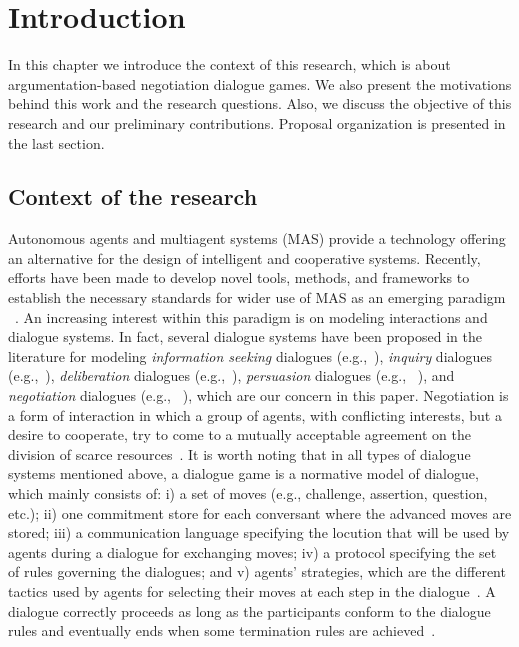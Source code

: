 \setcounter{chapter}{0}
\chapter{Introduction}\label{sec:intro}
In this chapter we introduce the context of this research, which is about argumentation-based negotiation dialogue games. We also present the motivations behind this work and the research questions. Also, we discuss the objective of this research and our preliminary contributions. Proposal organization is presented in the last section.

\section{Context of the research}\label{sec:context}

Autonomous agents and multiagent systems (MAS) provide a technology offering an alternative for the design of intelligent and cooperative
systems. Recently, efforts have been made to develop novel tools, methods, and frameworks to establish the necessary standards for wider
use of MAS as an emerging paradigm ~\cite{Mehdi03}. An increasing interest within this paradigm is on modeling interactions and dialogue systems.
In fact, several dialogue systems have been proposed in the literature for modeling \emph{information seeking} dialogues (e.g.,~\cite{MWParsons03}),
\emph{inquiry} dialogues (e.g.,~\cite{BlackH07,Black09}), \emph{deliberation} dialogues (e.g.,~\cite{Tolchinsky2012}), \emph{persuasion}
dialogues (e.g., ~\cite{Amgoud00}), and \emph{negotiation} dialogues (e.g., ~\cite{KSycara90}), which are our concern in this paper.
Negotiation is a form of interaction in which a group of agents, with conflicting interests, but a desire to cooperate, try to come to a mutually
acceptable agreement on the division of scarce resources~\cite{Rahwan03,Bentahar07}. It is worth noting that in all types of dialogue systems
mentioned above, a dialogue game is a normative model of dialogue, which mainly consists of: i) a set of moves (e.g., challenge, assertion, question, etc.);
ii) one commitment store for each conversant where the advanced moves are stored; iii) a communication language specifying the locution that will be
used by agents during a dialogue for exchanging moves; iv) a protocol specifying the set of rules governing the dialogues; and v) agents' strategies,
which are the different tactics used by agents for selecting their moves at each step in the dialogue~\cite{AmgoudS08}. A dialogue correctly proceeds
as long as the participants conform to the dialogue rules and eventually ends when some termination rules are achieved~\cite{AmgoudS08,Nicolas03,Prakken01}.

